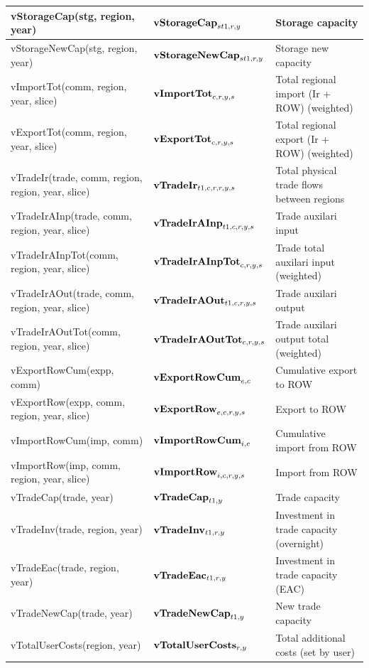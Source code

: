 \documentclass{article}
\begin{document}
\begin{longtable}{|p{10cm}|p{5cm}|p{9cm}|}
 \hline
vStorageCap(stg, region, year) & ${\bf vStorageCap}_{st1,r,y}$ & Storage capacity \\ 
 \hline
vStorageNewCap(stg, region, year) & ${\bf vStorageNewCap}_{st1,r,y}$ & Storage new capacity \\ 
 \hline
vImportTot(comm, region, year, slice) & ${\bf vImportTot}_{c,r,y,s}$ & Total regional import (Ir + ROW) (weighted) \\ 
 \hline
vExportTot(comm, region, year, slice) & ${\bf vExportTot}_{c,r,y,s}$ & Total regional export (Ir + ROW) (weighted) \\ 
 \hline
vTradeIr(trade, comm, region, region, year, slice) & ${\bf vTradeIr}_{t1,c,r,r,y,s}$ & Total physical trade flows between regions \\ 
 \hline
vTradeIrAInp(trade, comm, region, year, slice) & ${\bf vTradeIrAInp}_{t1,c,r,y,s}$ & Trade auxilari input \\ 
 \hline
vTradeIrAInpTot(comm, region, year, slice) & ${\bf vTradeIrAInpTot}_{c,r,y,s}$ & Trade total auxilari input (weighted) \\ 
 \hline
vTradeIrAOut(trade, comm, region, year, slice) & ${\bf vTradeIrAOut}_{t1,c,r,y,s}$ & Trade auxilari output \\ 
 \hline
vTradeIrAOutTot(comm, region, year, slice) & ${\bf vTradeIrAOutTot}_{c,r,y,s}$ & Trade auxilari output total (weighted) \\ 
 \hline
vExportRowCum(expp, comm) & ${\bf vExportRowCum}_{e,c}$ & Cumulative export to ROW \\ 
 \hline
vExportRow(expp, comm, region, year, slice) & ${\bf vExportRow}_{e,c,r,y,s}$ & Export to ROW \\ 
 \hline
vImportRowCum(imp, comm) & ${\bf vImportRowCum}_{i,c}$ & Cumulative import from ROW \\ 
 \hline
vImportRow(imp, comm, region, year, slice) & ${\bf vImportRow}_{i,c,r,y,s}$ & Import from ROW \\ 
 \hline
vTradeCap(trade, year) & ${\bf vTradeCap}_{t1,y}$ & Trade capacity \\ 
 \hline
vTradeInv(trade, region, year) & ${\bf vTradeInv}_{t1,r,y}$ & Investment in trade capacity (overnight) \\ 
 \hline
vTradeEac(trade, region, year) & ${\bf vTradeEac}_{t1,r,y}$ & Investment in trade capacity (EAC) \\ 
 \hline
vTradeNewCap(trade, year) & ${\bf vTradeNewCap}_{t1,y}$ & New trade capacity \\ 
 \hline
vTotalUserCosts(region, year) & ${\bf vTotalUserCosts}_{r,y}$ & Total additional costs (set by user) \\ 
 \hline
\end{longtable}
\end{document}
